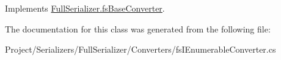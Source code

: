 Implements \hyperlink{class_full_serializer_1_1fs_base_converter_aeb0065770e53ecaac3f5dd3b5cd670d1}{Full\+Serializer.\+fs\+Base\+Converter}.



The documentation for this class was generated from the following file\+:\begin{DoxyCompactItemize}
\item 
Project/\+Serializers/\+Full\+Serializer/\+Converters/fs\+I\+Enumerable\+Converter.\+cs\end{DoxyCompactItemize}
